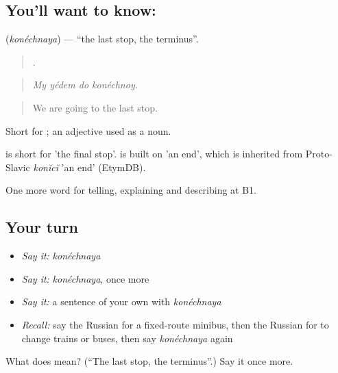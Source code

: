\subsection*{You'll want to know: }
\textbf{} (\emph{konéchnaya}) — \textquotedblleft{}the last stop, the terminus\textquotedblright{}.

\begin{quote}
   .
\end{quote}

\begin{quote}
\emph{My yédem do konéchnoy.}
\end{quote}

\begin{quote}
We are going to the last stop.
\end{quote}

Short for \emph{ }; an adjective used as a noun.

\begin{cousinweb}
\emph{} is short for \emph{ } 'the final stop'. \emph{} is built on \emph{} 'an end', which is inherited from Proto-Slavic \emph{konĭcĭ} 'an end' (EtymDB).
\end{cousinweb}

\begin{grammarlens}[title={What you've built}]
One more word for telling, explaining and describing at B1.
\end{grammarlens}

\subsection*{Your turn}
\begin{itemize}
\raggedright
  \item \emph{Say it:} \emph{konéchnaya}
  \item \emph{Say it:} \emph{konéchnaya}, once more
  \item \emph{Say it:} a sentence of your own with \emph{konéchnaya}
  \item \emph{Recall:} say the Russian for a fixed-route minibus, then the Russian for to change trains or buses, then say \emph{konéchnaya} again
\end{itemize}

\begin{tcolorbox}[breakable,colback=teal!4,colframe=teal!35!black,title={Before you move on}]
What does  mean? (\textquotedblleft{}The last stop, the terminus\textquotedblright{}.) Say it once more.
\end{tcolorbox}
